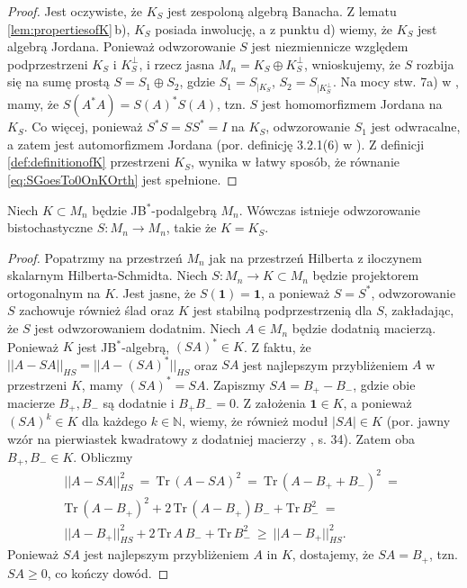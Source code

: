 {\begin{proof}
Jest oczywiste, że $K_{S}$ jest zespoloną algebrą Banacha.
Z lematu \ref{lem:propertiesofK}\,b),
$K_{S}$ posiada inwolucję,
a z punktu d) wiemy, że $K_{S}$ jest algebrą Jordana.
Ponieważ odwzorowanie $S$ jest niezmiennicze względem podprzestrzeni
$K_{S}$ i $K_{S}^{\perp}$,
i rzecz jasna $M_{n} = K_{S} \oplus K_{S}^{\perp}$,
wnioskujemy, że $S$ rozbija się na sumę prostą
$S = S_{1} \oplus S_{2}$,
gdzie $S_{1} = S_{| K_{S}}$, $S_{2} = S_{| K_{S}^{\perp}}$.
Na mocy stw. 7a) w \cite{olkiewicz1999environment},
mamy, że $S(A^{*} A) = S(A)^{*} S(A)$,
tzn. $S$ jest homomorfizmem Jordana na $K_{S}$.
Co więcej, ponieważ $S^{*} S = S S^{*} = I$ na $K_{S}$,
odwzorowanie $S_{1}$ jest odwracalne,
a zatem jest automorfizmem Jordana
(por. definicję 3.2.1(6) w \cite{Bratteli2003}).
Z definicji \eqref{def:definitionofK} przestrzeni $K_{S}$,
wynika w łatwy sposób, że
równanie \eqref{eq:SGoesTo0OnKOrth} jest spełnione.
\end{proof}

\begin{Theorem}
\label{thm:FromESbook}
Niech $K \subset M_{n}$ będzie JB$^{*}$-podalgebrą $M_{n}$.
Wówczas istnieje odwzorowanie bistochastyczne
$S \! : M_{n} \rightarrow M_{n}$, takie że $K = K_{S}$.
\end{Theorem}
\begin{proof}
Popatrzmy na przestrzeń $M_{n}$ jak na przestrzeń Hilberta z iloczynem skalarnym
Hilberta-Schmidta.
Niech $S\!: M_{n} \rightarrow K \subset M_{n}$ będzie
projektorem ortogonalnym na $K$.
Jest jasne, że $S(\mathbf{1}) = \mathbf{1}$,
a ponieważ $S = S^{*}$,
odwzorowanie $S$ zachowuje również ślad oraz
$K$ jest stabilną podprzestrzenią dla $S$,
zakładając, że $S$ jest odwzorowaniem dodatnim.
Niech $A \in M_{n}$  będzie dodatnią macierzą.
Ponieważ $K$ jest JB$^{*}$-algebrą,
$(SA)^{*} \in K$.
Z faktu, że
$|| A - SA ||_{HS} = || A - (SA)^{*} ||_{HS}$
oraz $SA$ jest najlepszym przybliżeniem $A$ w przestrzeni $K$,
mamy $(SA)^{*} = SA$.
Zapiszmy $SA = B_{+} - B_{-}$,
gdzie obie macierze $B_{+}, B_{-}$ są dodatnie i
$B_{+} B_{-} = 0$.
Z założenia $\mathbf{1} \in K$,
a ponieważ $(SA)^{k} \in K$ dla każdego $k \in \mathbb{N}$,
wiemy, że również moduł $|S A| \in K$
(por. jawny wzór na pierwiastek kwadratowy z dodatniej macierzy
\cite{Bratteli2003}, s. 34).
Zatem oba $B_{+}, B_{-} \in K$.
Obliczmy
\begin{multline}
|| A - SA ||_{HS}^{2} \: = \: \text{Tr} \, ( A - SA )^{2} \: = \:
    \text{Tr} \, ( A - B_{+} + B_{-} )^{2} \: = \: \\
    \text{Tr} \, ( A - B_{+} )^{2} +
        2 \, \text{Tr} \, ( A - B_{+} ) B_{-} + \text{Tr} \, B_{-}^{2}
            \: = \: \\
    || A - B_{+} ||_{HS}^{2} +
        2 \, \text{Tr} \,  A \, B_{-}+ \text{Tr} \, B_{-}^{2}
    \: \geq \: || A - B_{+} ||_{HS}^{2}.
\end{multline}
Ponieważ $SA$ jest najlepszym przybliżeniem $A$ in $K$,
dostajemy, że $SA = B_{+}$, tzn. $SA \geq 0$, co kończy dowód.
\end{proof}


}
